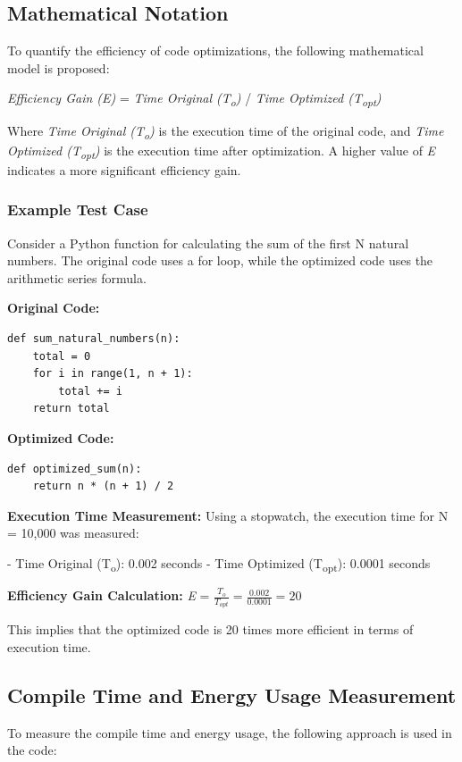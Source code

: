 \documentclass[conference,compsoc]{IEEEtran}
\begin{document}
\subsection{Mathematical Notation}
To quantify the efficiency of code optimizations, the following mathematical model is proposed:

\textit{Efficiency Gain (E)} = \textit{Time Original (T\textsubscript{o})} / \textit{Time Optimized (T\textsubscript{opt})}

Where \textit{Time Original (T\textsubscript{o})} is the execution time of the original code, and \textit{Time Optimized (T\textsubscript{opt})} is the execution time after optimization. A higher value of \textit{E} indicates a more significant efficiency gain.

\subsubsection{Example Test Case}
Consider a Python function for calculating the sum of the first N natural numbers. The original code uses a for loop, while the optimized code uses the arithmetic series formula.

\textbf{Original Code:}
\begin{verbatim}
def sum_natural_numbers(n):
    total = 0
    for i in range(1, n + 1):
        total += i
    return total
\end{verbatim}

\textbf{Optimized Code:}
\begin{verbatim}
def optimized_sum(n):
    return n * (n + 1) / 2
\end{verbatim}

\textbf{Execution Time Measurement:}
Using a stopwatch, the execution time for N = 10,000 was measured:

- Time Original (T\textsubscript{o}): 0.002 seconds
- Time Optimized (T\textsubscript{opt}): 0.0001 seconds

\textbf{Efficiency Gain Calculation:}
\textit{E} = $\frac{T_{o}}{T_{opt}} = \frac{0.002}{0.0001} = 20$

This implies that the optimized code is 20 times more efficient in terms of execution time.

\subsection{Compile Time and Energy Usage Measurement}
To measure the compile time and energy usage, the following approach is used in the code:
\end{document}
